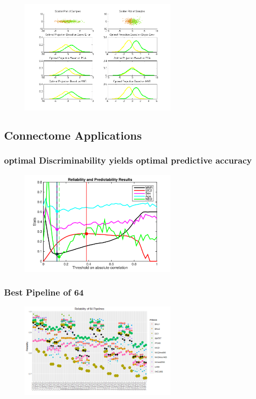 \documentclass{article}
\begin{document}
\begin{figure}[t!]
\includegraphics[width=3.0in]{../Figs/parameter_selection_2sub.png}
\caption{}
\label{fig:64}
\end{figure}




\subsection{Connectome Applications}

\subsubsection{optimal Discriminability yields optimal predictive accuracy}

\begin{figure}[t!]
\includegraphics[width=3.0in]{../Figs/HCP.png}
\caption{}
\label{fig:64}
\end{figure}


\subsubsection{Best Pipeline of 64}

\begin{figure}[t!]
\includegraphics[width=3.0in]{../Figs/64_pipelines_gg.png}
\caption{}
\label{fig:64}
\end{figure}
\end{document}
